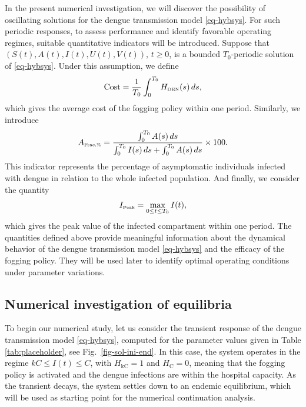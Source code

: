 \documentclass[preprint]{elsarticle}
\begin{document}
In the present numerical investigation, we will discover the possibility of oscillating solutions for the dengue transmission model \eqref{eq-hybsys}. For such periodic responses, to assess performance and identify favorable operating regimes, suitable quantitative indicators will be introduced. Suppose that $(S(t),A(t),I(t),U(t),V(t))$, $t\geq0$, is a bounded $T_{0}$-periodic solution of \eqref{eq-hybsys}. Under this assumption, we define
\begin{equation}
	\label{eq-M_AVcost}
	\mbox{Cost}=\frac{1}{T_{0}}\int_{0}^{T_{0}}H_{\text{\tiny DEN}}(s)\,ds,
\end{equation}
which gives the average cost of the fogging policy within one period. Similarly, we introduce
\begin{equation}
	\label{eq-MDARK}
	A_{\text{\tiny Frac,\%}}=\frac{\int_{0}^{T_{0}}A(s)\,ds}{\int_{0}^{T_{0}}I(s)\,ds+\int_{0}^{T_{0}}A(s)\,ds}\times100.
\end{equation}
This indicator represents the percentage of asymptomatic individuals infected with dengue in relation to the whole infected population. And finally, we consider the quantity
\begin{equation}
	\label{eq-MIpeak}
	I_{\text{\tiny Peak}}=\max_{0\leq t\leq
	T_{0}}I(t),
\end{equation}
which gives the peak value of the infected compartment within one period. The quantities defined above provide meaningful information about the dynamical behavior of the dengue transmission model \eqref{eq-hybsys} and the efficacy of the fogging policy. They will be used later to identify optimal operating conditions under parameter variations.

\subsection{Numerical investigation of equilibria}

To begin our numerical study, let us consider the transient response of the dengue transmission model \eqref{eq-hybsys}, computed for the parameter values given in Table \ref{tab:placeholder}, see Fig.\ \ref{fig-sol-ini-end}. In this case, the system operates in the regime $kC\leq I(t)\leq C$, with $H_{\mathrm{kC}}=1$ and $H_{\mathrm{C}}=0$, meaning that the fogging policy is activated and the dengue infections are within the hospital capacity. As the transient decays, the system settles down to an endemic equilibrium, which will be used as starting point for the numerical continuation analysis.
\end{document}

